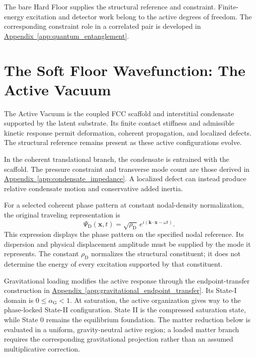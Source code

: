The bare Hard Floor supplies the structural reference and constraint. Finite-energy excitation and detector work belong to the active degrees of freedom. The corresponding constraint role in a correlated pair is developed in \hyperref[app:quantum_entanglement]{Appendix~\ref*{app:quantum_entanglement}}.

\section{The Soft Floor Wavefunction: The Active Vacuum}

The Active Vacuum is the coupled FCC scaffold and interstitial condensate supported by the latent substrate. Its finite contact stiffness and admissible kinetic response permit deformation, coherent propagation, and localized defects. The structural reference remains present as these active configurations evolve.

In the coherent translational branch, the condensate is entrained with the scaffold. The pressure constraint and transverse mode count are those derived in \hyperref[app:condensate_impedance]{Appendix~\ref*{app:condensate_impedance}}. A localized defect can instead produce relative condensate motion and conservative added inertia.

For a selected coherent phase pattern at constant nodal-density normalization, the original traveling representation is
\begin{equation}
    \boxed{
    \Psi_{\mathrm D}(\mathbf x,t)
    =\sqrt{\rho_{\mathrm D}}\,
    e^{i(\mathbf k\cdot\mathbf x-\omega t)}
    }.
\end{equation}
This expression displays the phase pattern on the specified nodal reference. Its dispersion and physical displacement amplitude must be supplied by the mode it represents. The constant $\rho_{\mathrm D}$ normalizes the structural constituent; it does not determine the energy of every excitation supported by that constituent.

Gravitational loading modifies the active response through the endpoint-transfer construction in \hyperref[app:gravitational_endpoint_transfer]{Appendix~\ref*{app:gravitational_endpoint_transfer}}. Its State-I domain is $0\leq\alpha_{\mathrm G}<1$. At saturation, the active organization gives way to the phase-locked State-II configuration. State II is the compressed saturation state, while State 0 remains the equilibrium foundation. The matter reduction below is evaluated in a uniform, gravity-neutral active region; a loaded matter branch requires the corresponding gravitational projection rather than an assumed multiplicative correction.

